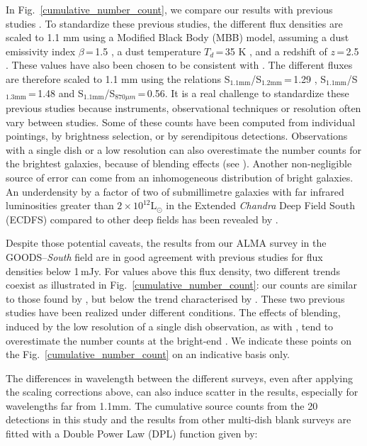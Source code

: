 \documentclass[longauth]{aa}
\begin{document}
In Fig.~\ref{cumulative_number_count}, we compare our results with previous studies \citep{Lindner2011,Scott2012,Karim2013,Hatsukade2013, Simpson2015, Oteo2015, Hatsukade2016, Aravena2016,Fujimoto2016,Umehata2017, Geach2017, Dunlop2017}. To standardize these previous studies, the different flux densities are scaled to 1.1 mm using a Modified Black Body (MBB) model, assuming a dust emissivity index $\beta$\,=\,1.5 \citep[e.g.][]{Gordon2010}, a dust temperature $T_d$\,=\,35 K  \citep[eg.][]{Chapman2005, Kovacs2006, Coppin2008}, and a redshift of $z$\,=\,2.5 \citep[e.g.][]{Wardlow2011,Yun2012}. These values have also been chosen to be consistent with \cite{Hatsukade2016}. The different fluxes are therefore scaled to 1.1 mm using the relations S$_{1.1\text{mm}}$/S$_{1.2\text{mm}}$\,=\,1.29 , S$_{1.1\text{mm}}$/S$_{1.3\text{mm}}$\,=\,1.48 and S$_{1.1\text{mm}}$/S$_{870\mu m}$\,=\,0.56. It is a real challenge to standardize these previous studies because instruments, observational techniques or resolution often vary between studies. Some of these counts have been computed from individual pointings, by brightness selection, or by serendipitous detections. Observations with a single dish or a low resolution can also overestimate the number counts for the brightest galaxies, because of blending effects (see \citealt{Ono2014}). Another non-negligible source of error can come from an inhomogeneous distribution of bright galaxies. An underdensity by a factor of two of submillimetre galaxies with far infrared luminosities greater than $2 \times 10^{12}$L$_\odot$ in the Extended \textit{Chandra} Deep Field South (ECDFS) compared to other deep fields has been revealed by \cite{Weiss2009}.

Despite those potential caveats, the results from our ALMA survey in the GOODS--\textit{South} field are in good agreement with previous studies for flux densities below 1\,mJy. For values above this flux density, two different trends coexist as illustrated in Fig.~\ref{cumulative_number_count}: our counts are similar to those found by \cite{Karim2013}, but below the trend characterised by \cite{Scott2012}. These two previous studies have been realized under different conditions. The effects of blending, induced by the low resolution of a single dish observation, as with \cite{Scott2012}, tend to overestimate the number counts at the bright-end \citep[][]{Ono2014, Karim2013, Bethermin2017}. We indicate these points on the  Fig.~\ref{cumulative_number_count} on an indicative basis only. 

The differences in wavelength between the different surveys, even after applying the scaling corrections above, can also induce scatter in the results, especially for wavelengths far from 1.1mm.
The cumulative source counts from the 20 detections in this study and the results from other multi-dish blank surveys are fitted with a Double Power Law (DPL) function \citep[e.g.][]{Scott2002} given by:
\end{document}
